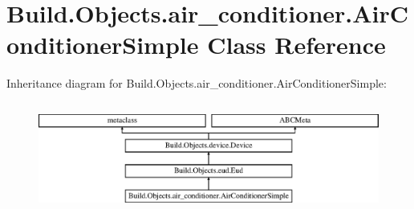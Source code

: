 \hypertarget{class_build_1_1_objects_1_1air__conditioner_1_1_air_conditioner_simple}{}\section{Build.\+Objects.\+air\+\_\+conditioner.\+Air\+Conditioner\+Simple Class Reference}
\label{class_build_1_1_objects_1_1air__conditioner_1_1_air_conditioner_simple}
Inheritance diagram for Build.\+Objects.\+air\+\_\+conditioner.\+Air\+Conditioner\+Simple\+:\begin{figure}[H]
\begin{center}
\leavevmode
\includegraphics[height=3.648208cm]{class_build_1_1_objects_1_1air__conditioner_1_1_air_conditioner_simple}
\end{center}
\end{figure}

